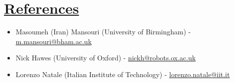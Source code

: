 \documentclass[11pt]{article}
\begin{document}
\section*{\underline{References}}
\begin{itemize}
\item Masoumeh (Iran) Mansouri (University of Birmingham) - \href{mailto:m.mansouri@bham.ac.uk}{\url{m.mansouri@bham.ac.uk}}
\item Nick Hawes (University of Oxford) - \href{mailto:nickh@robots.ox.ac.uk}{\url{nickh@robots.ox.ac.uk}}
\item Lorenzo Natale (Italian Institute of Technology) - \href{lorenzo.natale@iit.it}{\url{lorenzo.natale@iit.it}}
\end{itemize}
\end{document}
